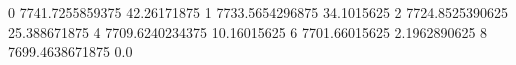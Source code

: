 0 7741.7255859375 42.26171875
1 7733.5654296875 34.1015625
2 7724.8525390625 25.388671875
4 7709.6240234375 10.16015625
6 7701.66015625 2.1962890625
8 7699.4638671875 0.0
